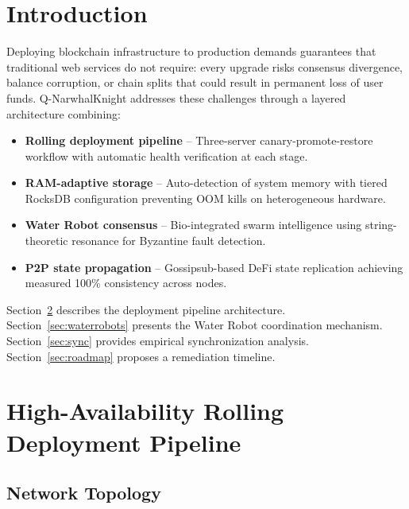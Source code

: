 \documentclass[11pt,a4paper,twocolumn]{article}
\begin{document}
\section{Introduction}

Deploying blockchain infrastructure to production demands guarantees that traditional
web services do not require: every upgrade risks consensus divergence, balance corruption,
or chain splits that could result in permanent loss of user funds. Q-NarwhalKnight
addresses these challenges through a layered architecture combining:

\begin{itemize}[nosep,leftmargin=*]
    \item \textbf{Rolling deployment pipeline} -- Three-server canary-promote-restore
          workflow with automatic health verification at each stage.
    \item \textbf{RAM-adaptive storage} -- Auto-detection of system memory with tiered
          RocksDB configuration preventing OOM kills on heterogeneous hardware.
    \item \textbf{Water Robot consensus} -- Bio-integrated swarm intelligence using
          string-theoretic resonance for Byzantine fault detection.
    \item \textbf{P2P state propagation} -- Gossipsub-based DeFi state replication
          achieving measured 100\% consistency across nodes.
\end{itemize}

Section~\ref{sec:pipeline} describes the deployment pipeline architecture.
Section~\ref{sec:waterrobots} presents the Water Robot coordination mechanism.
Section~\ref{sec:sync} provides empirical synchronization analysis.
Section~\ref{sec:roadmap} proposes a remediation timeline.

\section{High-Availability Rolling Deployment Pipeline}
\label{sec:pipeline}

\subsection{Network Topology}
\end{document}
